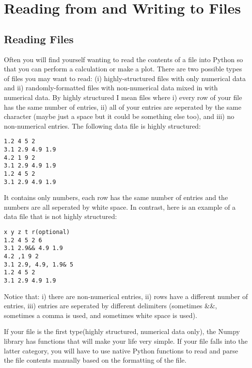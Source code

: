 \chapter{Reading from and Writing to Files}

\label{chap:fileio}

\section{Reading Files}
Often you will find yourself wanting to read the contents of a file
into Python so that you can perform a calculation or make a plot.
There are two possible types of files you may want to read: (i)
highly-structured files with only numerical data and ii)
randomly-formatted files with non-numerical data mixed in with
numerical data.  By highly structured I mean files where i) every row of your
file has the same number of entries, ii) all of your entries are
seperated by the same character (maybe just a space but it could be
something else too), and iii) no non-numerical entries.  The following
data file is highly structured:
\begin{Verbatim}
1.2 4 5 2
3.1 2.9 4.9 1.9
4.2 1 9 2
3.1 2.9 4.9 1.9
1.2 4 5 2
3.1 2.9 4.9 1.9
\end{Verbatim}
It contains only numbers, each row has the same number of entries and
the numbers are all seperated by white space.  In contrast, here is an
example of a data file that is not highly structured:
\begin{Verbatim}
x y z t r(optional)
1.2 4 5 2 6
3.1 2.9&& 4.9 1.9
4.2 ,1 9 2
3.1 2.9, 4.9, 1.9& 5
1.2 4 5 2
3.1 2.9 4.9 1.9
\end{Verbatim}
Notice that: i) there are non-numerical entries, ii) rows have a
different number of entries, iii) entries are seperated by different
delimiters (sometimes \&\&, sometimes a comma is used, and sometimes
white space is used).

If your file is the first type(highly structured, numerical data
only), the Numpy library has functions that will make your life very
simple.  If your file falls into the latter category, you will have to
use native Python functions to read and parse the file contents manually based
on the formatting of the file.

